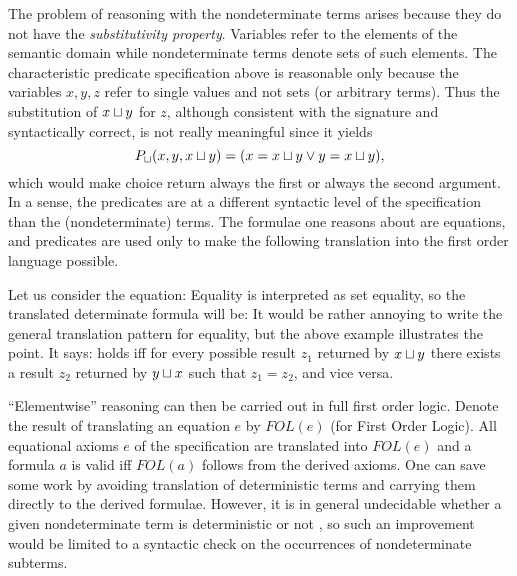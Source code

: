 {The problem of reasoning with the nondeterminate terms arises because they do not have the 
{\em substitutivity property}. Variables refer to the elements of the semantic domain while nondeterminate 
terms denote sets of such elements. The characteristic predicate specification above is reasonable only 
because the variables $x, y, z$ refer to single values and not sets (or arbitrary terms). Thus the substitution of 
$x\sqcup y$ for $z$, although consistent with the signature and syntactically correct, is not really meaningful since it 
yields
\[
P_{\sqcup}(x,y,x\sqcup y)  =  (x=x\sqcup y \lor y=x\sqcup y), 
\]
which would make choice return always the first or always the second argument. In a sense, the predicates 
are at a different syntactic level of the specification than the (nondeterminate) terms.  The formulae one 
reasons about are equations, and predicates are used only to make the following 
translation \cite{c:121} into the first 
order language possible. 

Let us consider the equation:
Equality is interpreted as set equality, so the translated determinate formula will be:
It would be rather annoying to write the general translation pattern 
for equality, but the above example 
illustrates the point. It says:  holds iff for every possible 
result $z_{1}$ returned by $x\sqcup y$ there exists a result $z_{2}$ 
returned by $y\sqcup x$ such that $z_{1}=z_{2}$, and vice versa.

``Elementwise'' reasoning can then be carried out in full first order
logic. Denote the result of translating an equation $e$ by $FOL(e)$
(for First Order Logic). All equational axioms $e$ of the
specification are translated into $FOL(e)$ and a formula $a$ is valid
iff $FOL(a)$ follows from the derived axioms. One can save some work
by avoiding translation of deterministic terms and carrying them
directly to the derived formulae. However, it is in general
undecidable whether a given nondeterminate term is deterministic or
not \cite{c:18}, so such an improvement would be limited to a
syntactic check on the occurrences of nondeterminate subterms.

}
